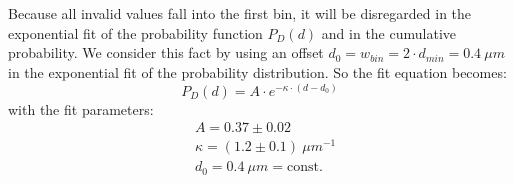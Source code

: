     	 \minipend\\
    	 \ \\   
    	 Because all invalid values fall into the first bin, it will be disregarded in the exponential fit of the probability function $P_D(d)$ and in the cumulative probability. We consider this fact by using an offset $d_0 = w_{bin} = 2 \cdot d_{min} = 0.4\ \unit{\mu m}$ in the exponential fit of the probability distribution. So the fit equation becomes:
    	 \begin{equation*}
    	 	P_D(d) = A \cdot e^{-\kappa\cdot(d-d_0)}
    	 \end{equation*}
    	 with the fit parameters:
    	 \begin{align*}
    	  	&A = 0.37 \pm 0.02\\
    	  	&\kappa = (1.2 \pm 0.1)\ \unit{\mu m^{-1}}\\
    	  	&d_0 = 0.4\ \unit{\mu m}= \mathrm{const.}
    	 \end{align*}
    	 
